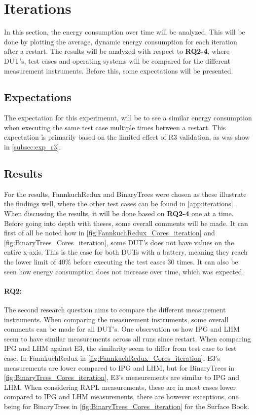 \section{Iterations}\label{sec:iterations}

In this section, the energy consumption over time will be analyzed. This will be done by plotting the average, dynamic energy consumption for each iteration after a restart. The results will be analyzed with respect to \textbf{RQ2-4}, where DUT's, test cases and operating systems will be compared for the different measurement instruments. Before this, some expectations will be presented.

\subsection{Expectations}

The expectation for this experimennt, will be to see a similar energy consumption when executing the same test case multiple times between a restart. This expectation is primarily based on the limited effect of R3 validation, as was show in \cref*{subsec:exp_r3}.

\subsection{Results}

For the results, FannkuchRedux and BinaryTrees were chosen as these illustrate the findings well, where the other test cases can be found in \cref{app:iterations}. When discussing the results, it will be done based on \textbf{RQ2-4} one at a time. Before going into depth with theses, some overall comments will be made. It can first of all be noted how in \cref{fig:FannkuchRedux_Cores_iteration} and \cref{fig:BinaryTrees_Cores_iteration}, some DUT's does not have values on the entire x-axis. This is the case for both DUTs with a battery, meaning they reach the lower limit of 40\% before executing the test cases 30 times. It can also be seen how energy consumption does not increase over time, which was expected. 

\paragraph*{RQ2:} The second research question aims to compare the different measurement instruments. When comparing the measurement instruments, some overall comments can be made for all DUT's. One observation os how IPG and LHM seem to have similar measurements across all runs since restart. When comparing IPG and LHM against E3, the similarity seem to differ from test case to test case. In FannkuchRedux in \cref{fig:FannkuchRedux_Cores_iteration}, E3's measurements are lower compared to IPG and LHM, but for BinaryTrees in \cref{fig:BinaryTrees_Cores_iteration}, E3's measurements are similar to IPG and LHM. When considering RAPL measurements, these are in most cases lower compared to IPG and LHM measurements, there are however exceptions, one being for BinaryTrees in \cref*{fig:BinaryTrees_Cores_iteration} for the Surface Book.



